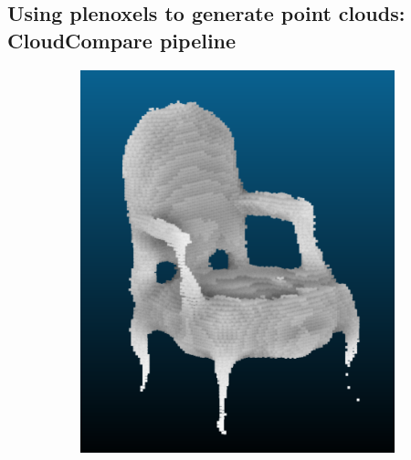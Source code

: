 \documentclass{article}
\begin{document}
\subsection{Using plenoxels to generate point clouds: CloudCompare pipeline}


\begin{figure}[!h]
 \centering
\begin{subfigure}{.24\textwidth}
  \centering
  \includegraphics[width=\linewidth]{figs/pc/chair.png}  
\end{subfigure}
\begin{subfigure}{.24\textwidth}
  \centering

\end{subfigure}
\end{figure}
\end{document}
